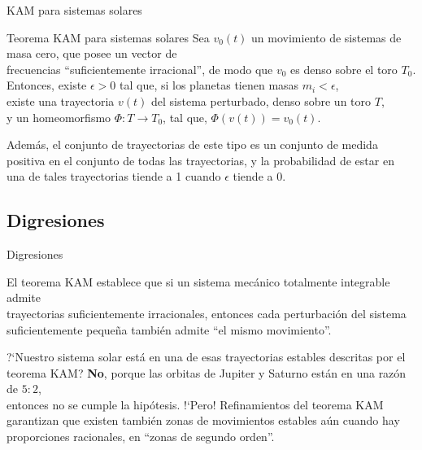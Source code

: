 \documentclass[8pt]{beamer}
\renewcommand{\>}{\rangle}
\newcommand{\<}{\langle}
\begin{document}
\begin{frame}{KAM para sistemas solares}

\begin{mybox}{Teorema KAM para sistemas solares}
Sea $v_{0}(t)$ un movimiento de sistemas de masa cero, que posee un vector de\\[5pt] frecuencias ``suficientemente irracional'', de modo que $v_{0}$ es denso sobre el toro $T_{0}$.\\[5pt]
Entonces, existe $\epsilon > 0$ tal que, si los planetas tienen masas $m_{i} < \epsilon$,\\[5pt] existe una trayectoria $v(t)$ del sistema perturbado, denso sobre un toro $T$,\\[5pt] y un homeomorfismo $\Phi: T \rightarrow T_{0}$, tal que, $\Phi(v(t))=v_{0}(t)$.
\vspace{0.5cm}

Además, el conjunto de trayectorias de este tipo es un conjunto de medida positiva en el conjunto de todas las trayectorias, y la probabilidad de estar en una de tales trayectorias tiende a 1 cuando $\epsilon$ tiende a 0.
\end{mybox}

\end{frame}

\subsection[Digresiones]{Digresiones}

\begin{frame}{Digresiones}

\begin{mybluebox}{}
El teorema KAM establece que si un sistema mecánico totalmente integrable admite\\[2pt] trayectorias suficientemente irracionales, entonces cada perturbación del sistema\\[2pt] suficientemente pequeña también admite ``el mismo movimiento''. 
\end{mybluebox}
\bigskip

\begin{mybluebox}{?`Nuestro sistema solar está en una de esas trayectorias estables descritas por el teorema KAM?}
\textbf{No}, porque las orbitas de Jupiter y Saturno están en una razón de $5:2$, \\[2pt] entonces no se cumple la hipótesis. !`Pero! Refinamientos del teorema KAM \\[2pt] garantizan que existen también zonas de movimientos estables aún cuando hay \\[2pt]proporciones racionales, en ``zonas de segundo orden''.
\end{mybluebox}
\end{frame}
\end{document}

